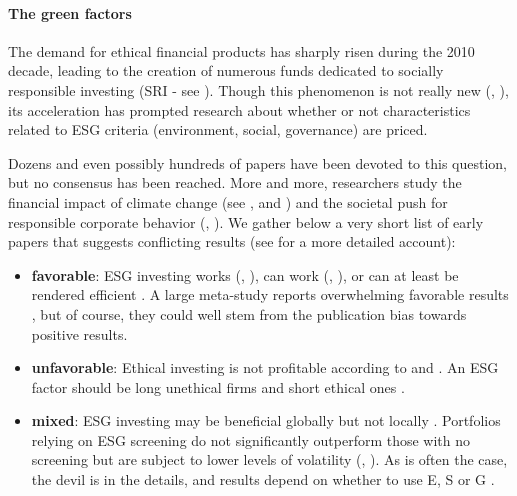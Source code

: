 \paragraph{The green factors}

The demand for ethical financial products has sharply risen during the 2010 decade, leading to the creation of numerous funds dedicated to socially responsible investing (SRI - see \cite{camilleri2020market}). Though this phenomenon is not really new (\cite{schueth2003socially}, \cite{hill2007corporate}), its acceleration has prompted research about whether or not characteristics related to ESG criteria (environment, social, governance) are priced.

Dozens and even possibly hundreds of papers have been devoted to this question, but no consensus has been reached. More and more, researchers study the financial impact of climate change (see \cite{bernstein2019disaster}, \cite{hong2019climate} and \cite{hong2020climate}) and the societal push for responsible corporate behavior (\cite{fabozzi2020introduction}, \cite{kurtz2020three}). We gather below a very short list of early papers that suggests conflicting results (see \cite{coqueret2022perspectives} for a more detailed account):

\begin{itemize}
\item \textbf{favorable}: ESG investing works (\cite{kempf2007effect}, \cite{cheema2020decarbonization}), can work (\cite{nagy2016can}, \cite{alessandrini2020optimal}), or can at least be rendered efficient \citep{branch2012socially}. A large meta-study reports overwhelming favorable results \citep{friede2015esg}, but of course, they could well stem from the publication bias towards positive results.
\item \textbf{unfavorable}: Ethical investing is not profitable according to \cite{adler2008cost} and \cite{blitz2020exclusion}. An ESG factor should be long unethical firms and short ethical ones \citep{lioui2018esg}.
\item \textbf{mixed}: ESG investing may be beneficial globally but not locally \citep{chakrabarti2020time}. Portfolios relying on ESG screening do not significantly outperform those with no screening but are subject to lower levels of volatility (\cite{gibson2020responsible}, \cite{gougler2020factor}). As is often the case, the devil is in the details, and results depend on whether to use E, S or G \citep{bruder2019integration}.
\end{itemize}

